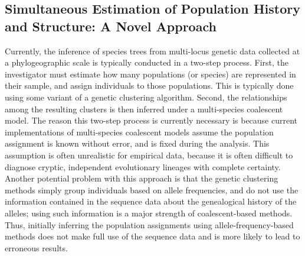\documentclass[10pt]{article}
\begin{document}
\subsection*{Simultaneous Estimation of Population History and Structure: A
Novel Approach}
Currently, the inference of species trees from multi-locus genetic data
collected at a phylogeographic scale is typically conducted in a two-step
process.
First, the investigator must estimate how many populations (or species) are
represented in their sample, and assign individuals to those populations.
This is typically done using some variant of a genetic clustering algorithm.
Second, the relationships among the resulting clusters is then inferred under a
multi-species coalescent model.
The reason this two-step process is currently necessary is because current
implementations of multi-species coalescent models assume the population
assignment is known without error, and is fixed during the analysis.
This assumption is often unrealistic for empirical data, because it is often
difficult to diagnose cryptic, independent evolutionary lineages with complete
certainty.
Another potential problem with this approach is that the genetic clustering
methods simply group individuals based on allele frequencies, and do not use
the information contained in the sequence data about the genealogical history
of the alleles; using such information is a major strength of coalescent-based
methods.
Thus, initially inferring the population assignments using
allele-frequency-based methods does not make full use of the sequence data and
is more likely to lead to erroneous results.
\end{document}
